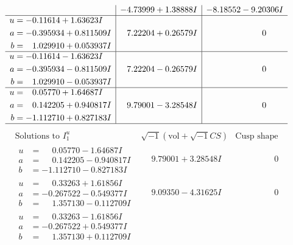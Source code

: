 \documentclass[1p]{elsarticle_modified}
\theoremstyle{definition}
\newcommand{\I}{\sqrt{-1}}
\begin{document}
$$\begin{array}{c|c|c}
 & -4.73999 + 1.38888 I & -8.18552 - 9.20306 I \\ \hline\begin{aligned}
u &= -0.11614 + 1.63623 I \\
a &= -0.395934 + 0.811509 I \\
b &= \phantom{-}1.029910 + 0.053937 I\end{aligned}
 & \phantom{-}7.22204 + 0.26579 I & \phantom{-0.000000 } 0 \\ \hline\begin{aligned}
u &= -0.11614 - 1.63623 I \\
a &= -0.395934 - 0.811509 I \\
b &= \phantom{-}1.029910 - 0.053937 I\end{aligned}
 & \phantom{-}7.22204 - 0.26579 I & \phantom{-0.000000 } 0 \\ \hline\begin{aligned}
u &= \phantom{-}0.05770 + 1.64687 I \\
a &= \phantom{-}0.142205 + 0.940817 I \\
b &= -1.112710 + 0.827183 I\end{aligned}
 & \phantom{-}9.79001 - 3.28548 I & \phantom{-0.000000 } 0\\
 \hline 
 \end{array}$$\newpage$$\begin{array}{c|c|c}  
\text{Solutions to }I^u_{1}& \I (\text{vol} + \sqrt{-1}CS) & \text{Cusp shape}\\
 \hline 
\begin{aligned}
u &= \phantom{-}0.05770 - 1.64687 I \\
a &= \phantom{-}0.142205 - 0.940817 I \\
b &= -1.112710 - 0.827183 I\end{aligned}
 & \phantom{-}9.79001 + 3.28548 I & \phantom{-0.000000 } 0 \\ \hline\begin{aligned}
u &= \phantom{-}0.33263 + 1.61856 I \\
a &= -0.267522 - 0.549377 I \\
b &= \phantom{-}1.357130 - 0.112709 I\end{aligned}
 & \phantom{-}9.09350 - 4.31625 I & \phantom{-0.000000 } 0 \\ \hline\begin{aligned}
u &= \phantom{-}0.33263 - 1.61856 I \\
a &= -0.267522 + 0.549377 I \\
b &= \phantom{-}1.357130 + 0.112709 I\end{aligned}

\end{array}$$
\end{document}
